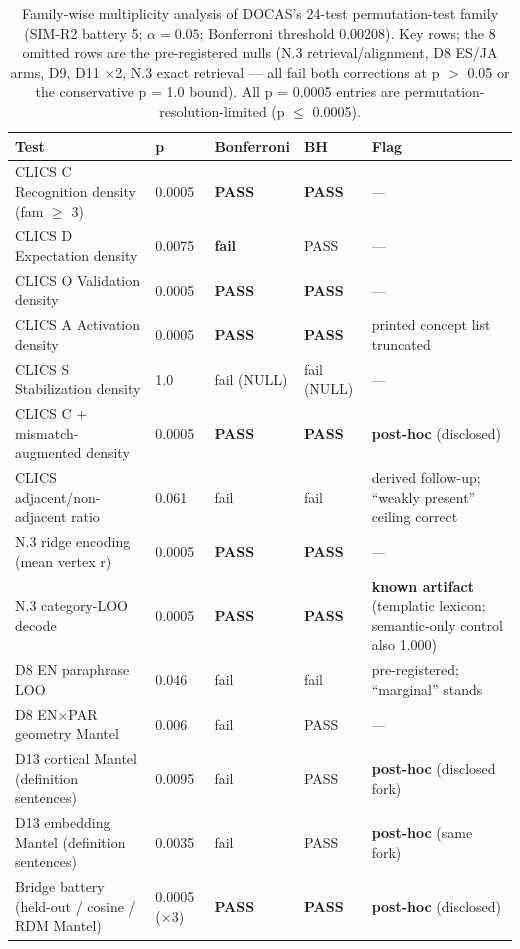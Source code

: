 \documentclass[11pt,twocolumn]{article}
\theoremstyle{plain}
\begin{document}
\begin{table}[t]
\centering\small
\caption{Family-wise multiplicity analysis of DOCAS's 24-test permutation-test family (SIM-R2 battery 5; \(\alpha = 0.05\); Bonferroni threshold 0.00208). Key rows; the 8 omitted rows are the pre-registered nulls (N.3 retrieval/alignment, D8 ES/JA arms, D9, D11 \(\times\)2, N.3 exact retrieval --- all fail both corrections at p \(>\) 0.05 or the conservative p = 1.0 bound). All p = 0.0005 entries are permutation-resolution-limited (p \(\leq\) 0.0005).}
\label{tab:multiplicity}
\begin{tabular}{@{}p{}p{}p{}p{}p{}@{}}
\toprule
Test & p & Bonferroni & BH & Flag \\
\midrule
CLICS C Recognition density (fam \(\geq\) 3) & 0.0005 & \textbf{PASS} & \textbf{PASS} & --- \\
CLICS D Expectation density & 0.0075 & \textbf{fail} & PASS & --- \\
CLICS O Validation density & 0.0005 & \textbf{PASS} & \textbf{PASS} & --- \\
CLICS A Activation density & 0.0005 & \textbf{PASS} & \textbf{PASS} & printed concept list truncated \\
CLICS S Stabilization density & 1.0 & fail (NULL) & fail (NULL) & --- \\
CLICS C + mismatch-augmented density & 0.0005 & \textbf{PASS} & \textbf{PASS} & \textbf{post-hoc} (disclosed) \\
CLICS adjacent/non-adjacent ratio & 0.061 & fail & fail & derived follow-up; ``weakly present'' ceiling correct \\
N.3 ridge encoding (mean vertex r) & 0.0005 & \textbf{PASS} & \textbf{PASS} & --- \\
N.3 category-LOO decode & 0.0005 & \textbf{PASS} & \textbf{PASS} & \textbf{known artifact} (templatic lexicon; semantic-only control also 1.000) \\
D8 EN paraphrase LOO & 0.046 & fail & fail & pre-registered; ``marginal'' stands \\
D8 EN\(\times\)PAR geometry Mantel & 0.006 & fail & PASS & --- \\
D13 cortical Mantel (definition sentences) & 0.0095 & fail & PASS & \textbf{post-hoc} (disclosed fork) \\
D13 embedding Mantel (definition sentences) & 0.0035 & fail & PASS & \textbf{post-hoc} (same fork) \\
Bridge battery (held-out / cosine / RDM Mantel) & 0.0005 (\(\times\)3) & \textbf{PASS} & \textbf{PASS} & \textbf{post-hoc} (disclosed) \\

\end{tabular}
\end{table}
\end{document}
